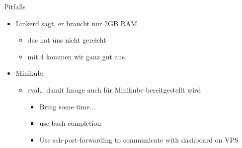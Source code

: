 Pitfalls
\begin{itemize}
	\item Linkerd sagt, er braucht nur 2GB RAM 
	\begin{itemize}
	\item das hat uns nicht gereicht
	\item mit 4 kommen wir ganz gut aus
	\end{itemize}
	\item Minikube
	\begin{itemize}
	\item eval… damit Image auch für Minikube bereitgestellt wird
	\begin{itemize}
	\item Bring some time...
	\item use bash-completion
	\item Use ssh-port-forwarding to communicate with dashboard on VPS
\end{itemize}
\end{itemize}
\end{itemize}

